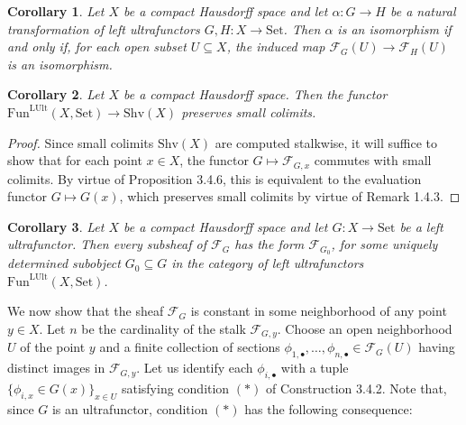 \documentclass[11pt]{article}
\theoremstyle{plain}
\newtheorem{corollary}{Corollary}
\theoremstyle{definition}
\begin{document}
\renewcommand{\thecorollary}{3.4.7}
\begin{corollary}
Let $X$ be a compact Hausdorff space and let $\alpha : G \to H$ be a natural transformation of left ultrafunctors $G, H : X \to \mathrm{Set}$. Then $\alpha$ is an isomorphism if and only if, for each open subset $U \subseteq X$, the induced map $\mathscr{F}_G(U) \to \mathscr{F}_H(U)$ is an isomorphism.
\end{corollary}

\renewcommand{\thecorollary}{3.4.8}
\begin{corollary}
Let $X$ be a compact Hausdorff space. Then the functor $\mathrm{Fun}^{\mathrm{LUlt}}(X,\mathrm{Set}) \to \mathrm{Shv}(X)$ preserves small colimits.
\end{corollary}

\begin{proof}
Since small colimits $\mathrm{Shv}(X)$ are computed stalkwise, it will suffice to show that for each point $x \in X$, the functor $G \mapsto \mathscr{F}_{G,x}$ commutes with small colimits. By virtue of Proposition 3.4.6, this is equivalent to the evaluation functor $G \mapsto G(x)$, which preserves small colimits by virtue of Remark 1.4.3.
\end{proof}

\renewcommand{\thecorollary}{3.4.9}
\begin{corollary}
Let $X$ be a compact Hausdorff space and let $G : X \to \mathrm{Set}$ be a left ultrafunctor. Then every subsheaf of $\mathscr{F}_G$ has the form $\mathscr{F}_{G_0}$, for some uniquely determined subobject $G_0 \subseteq G$ in the category of left ultrafunctors $\mathrm{Fun}^{\mathrm{LUlt}}(X,\mathrm{Set})$.
\end{corollary}


We now show that the sheaf $\mathscr{F}_G$ is constant in some neighborhood of any point $y \in X$. Let $n$ be the cardinality of the stalk $\mathscr{F}_{G,y}$. Choose an open neighborhood $U$ of the point $y$ and a finite collection of sections $\phi_{1,\bullet},\dots,\phi_{n,\bullet} \in \mathscr{F}_G(U)$ having distinct images in $\mathscr{F}_{G,y}$. Let us identify each $\phi_{i,\bullet}$ with a tuple $\{\phi_{i,x} \in G(x)\}_{x \in U}$ satisfying condition $(\ast)$ of Construction 3.4.2. Note that, since $G$ is an ultrafunctor, condition $(\ast)$ has the following consequence:
\end{document}
